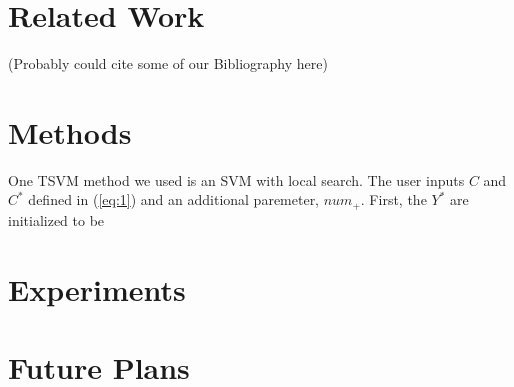 \documentclass[11pt]{article}
\begin{document}
\section{Related Work}
(Probably could cite some of our Bibliography here)
\section{Methods}
One TSVM method we used is an SVM with local search. The user inputs $C$ and $C^*$ defined in (\ref{eq:1}) and an additional paremeter, $num_+$. First, the $Y^*$ are initialized to be 
\section{Experiments}
\section{Future Plans}



\end{document}

